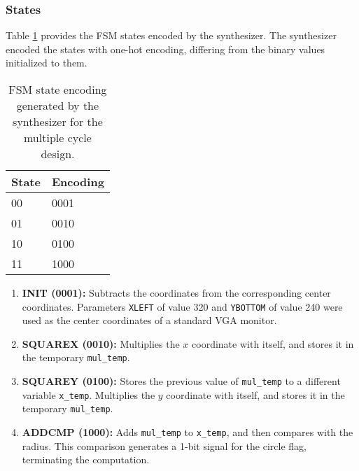 \documentclass[paper=usletter, fontsize=12pt]{article}
\begin{document}
        \subsubsection{States} Table \ref{table:multifsmcode} provides the FSM
        states encoded by the synthesizer. The synthesizer encoded the states
        with one-hot encoding, differing from the binary values initialized to
        them.

        \begin{table}[h]
            \caption{FSM state encoding generated by the synthesizer for the
            multiple cycle design.}
            \label{table:multifsmcode}
            \centering
            \begin{tabular}{ m{5em}m{5em} }
                \hline
                \textbf{State}  &   \textbf{Encoding} \\
                \hline
                00              &   0001 \\
                01              &   0010 \\
                10              &   0100 \\
                11              &   1000 \\
                \hline
            \end{tabular}
        \end{table}

        \begin{enumerate}

            \item \textbf{INIT (0001): } Subtracts the coordinates from the
            corresponding center coordinates. Parameters \texttt{XLEFT} of
            value 320 and \texttt{YBOTTOM} of value 240 were used as the center
            coordinates of a standard VGA monitor.

            \item \textbf{SQUAREX (0010): } Multiplies the $x$ coordinate with
            itself, and stores it in the temporary \texttt{mul\_temp}.

            \item \textbf{SQUAREY (0100): } Stores the previous value of
            \texttt{mul\_temp} to a different variable \texttt{x\_temp}.
            Multiplies the $y$ coordinate with itself, and stores it in the
            temporary \texttt{mul\_temp}.

            \item \textbf{ADDCMP (1000): } Adds \texttt{mul\_temp} to
            \texttt{x\_temp}, and then compares with the radius. This
            comparison generates a 1-bit signal for the circle flag,
            terminating the computation.

        \end{enumerate}
\end{document}
